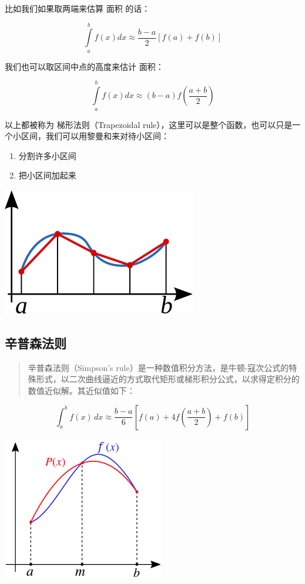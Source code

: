 \documentclass[
]{book}
\providecommand{\tightlist}{%
  \setlength{\itemsep}{0pt}\setlength{\parskip}{0pt}}
\begin{document}
比如我们如果取两端来估算 面积 的话：

\[{\displaystyle \int \limits _{a}^{b}f(x)dx\approx {\frac {b-a}{2}}[f(a)+f(b)]}\]

我们也可以取区间中点的高度来估计 面积：

\[{\displaystyle \int \limits _{a}^{b}f(x)dx\approx (b-a)f({\frac {a+b}{2}})}\]

以上都被称为 梯形法则（Trapezoidal rule），这里可以是整个函数，也可以只是一个小区间，我们可以用黎曼和来对待小区间：

\begin{enumerate}
\def\labelenumi{\arabic{enumi}.}
\tightlist
\item
  分割许多小区间
\item
  把小区间加起来
\end{enumerate}

\includegraphics{images/320px-Trapezoidal_rule_illustration_small.png}

\hypertarget{ux8f9bux666eux68eeux6cd5ux5219}{%
\subsection{辛普森法则}\label{ux8f9bux666eux68eeux6cd5ux5219}}

\begin{quote}
辛普森法则（Simpson's rule）是一种数值积分方法，是牛顿-寇次公式的特殊形式，以二次曲线逼近的方式取代矩形或梯形积分公式，以求得定积分的数值近似解。其近似值如下：
\end{quote}

\[\int_{a}^{b} f(x) \, dx \approx \frac{b-a}{6}\left[f(a) + 4f\left(\frac{a+b}{2}\right)+f(b)\right]\]

\includegraphics{images/Simpsons_method_illustration.png}
\end{document}
